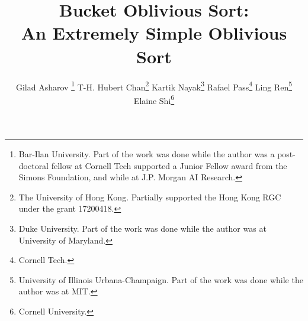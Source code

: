 \documentclass[twoside,leqno,twocolumn]{article}
\begin{document}
\title{\bf Bucket Oblivious Sort: \\An Extremely Simple Oblivious Sort}

\author{Gilad Asharov \thanks{Bar-Ilan University. Part of the work was done while the author was a post-doctoral fellow at Cornell Tech supported a Junior Fellow award from the Simons Foundation, and while at J.P. Morgan AI Research.} \quad
T-H. Hubert Chan\thanks{The University of Hong Kong. Partially supported the Hong Kong RGC under the grant 17200418.} \quad
Kartik Nayak\thanks{Duke University. Part of the work was done while the author was at University of Maryland.} \quad
Rafael Pass\thanks{Cornell Tech.} \quad
Ling Ren\thanks{University of Illinois Urbana-Champaign. Part of the work was done while the author was at MIT.} \quad
Elaine Shi\thanks{Cornell University.}}

\newcommand{\rl}[1]{{\footnotesize\color{orange}[Ling: #1]}}

\date{}

\maketitle


\begin{abstract}

\end{abstract}










\appendix

%
\end{document}
